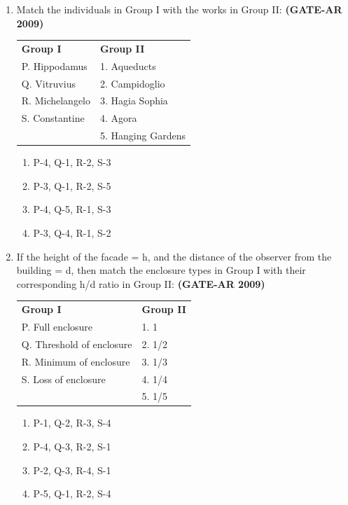 \documentclass[a4paper,10pt]{article}
\begin{document}
\begin{enumerate}
    \item Match the individuals in Group I with the works in Group II: \hfill \textbf{(GATE-AR 2009)} \\
    \begin{tabular}{ l l }
	\textbf{Group I} & \textbf{Group II} \\
	P. Hippodamus & 1. Aqueducts \\
	Q. Vitruvius & 2. Campidoglio \\
	R. Michelangelo & 3. Hagia Sophia \\
	S. Constantine & 4. Agora \\
	& 5. Hanging Gardens \\
	\end{tabular}
	\begin{multicols}{2}
	\begin{enumerate}
        \item P-4, Q-1, R-2, S-3
        \item P-3, Q-1, R-2, S-5
        \item P-4, Q-5, R-1, S-3
        \item P-3, Q-4, R-1, S-2
    \end{enumerate}
	\end{multicols}
    
    \item If the height of the facade = h, and the distance of the observer from the building = d, then match the enclosure types in Group I with their corresponding h/d ratio in Group II: \hfill \textbf{(GATE-AR 2009)} \\
    \begin{tabular}{ l l }
	\textbf{Group I} & \textbf{Group II} \\
	P. Full enclosure & 1. 1 \\
	Q. Threshold of enclosure & 2. 1/2 \\
	R. Minimum of enclosure & 3. 1/3 \\
	S. Loss of enclosure & 4. 1/4 \\
	& 5. 1/5 \\
	\end{tabular}
	\begin{multicols}{2}
	\begin{enumerate}
        \item P-1, Q-2, R-3, S-4
        \item P-4, Q-3, R-2, S-1
        \item P-2, Q-3, R-4, S-1
        \item P-5, Q-1, R-2, S-4
    \end{enumerate}
	\end{multicols}


\end{enumerate}
\end{document}
